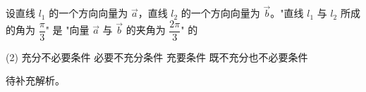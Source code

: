 \begin{choice}[topic={直线方向向量与夹角}]
设直线 $l_1$ 的一个方向向量为 $\vec{a}$，直线 $l_2$ 的一个方向向量为 $\vec{b}$。"直线 $l_1$ 与 $l_2$ 所成的角为 $\dfrac{\pi}{3}$" 是 "向量 $\vec{a}$ 与 $\vec{b}$ 的夹角为 $\dfrac{2\pi}{3}$" 的
\begin{tasks}(2)
	\task 充分不必要条件
	\task 必要不充分条件
	\task 充要条件
	\task 既不充分也不必要条件
\end{tasks}
\end{choice}
\begin{choice-sol}
待补充解析。
\end{choice-sol}
